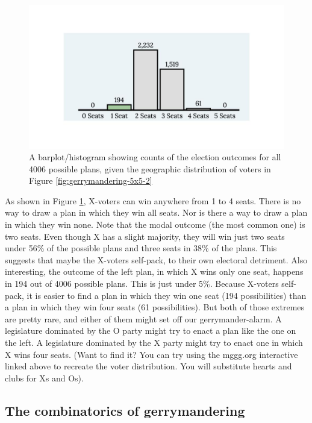\documentclass[
  openany]{book}
\begin{document}
\begin{figure}

{\centering \includegraphics[width=0.9\linewidth]{images/gerrymandering5x5_5}

}

\caption{A barplot/histogram showing counts of the election outcomes for all 4006 possible plans, given the geographic distribution of voters in Figure \ref{fig:gerrymandering-5x5-2}}\label{fig:gerrymandering-5x5-5}
\end{figure}

As shown in Figure \ref{fig:gerrymandering-5x5-5}, X-voters can win anywhere from 1 to 4 seats. There is no way to draw a plan in which they win all seats. Nor is there a way to draw a plan in which they win none. Note that the modal outcome (the most common one) is two seats. Even though X has a slight majority, they will win just two seats under 56\% of the possible plans and three seats in 38\% of the plans. This suggests that maybe the X-voters self-pack, to their own electoral detriment. Also interesting, the outcome of the left plan, in which X wins only one seat, happens in 194 out of 4006 possible plans. This is just under 5\%. Because X-voters self-pack, it is easier to find a plan in which they win one seat (194 possibilities) than a plan in which they win four seats (61 possibilities). But both of those extremes are pretty rare, and either of them might set off our gerrymander-alarm. A legislature dominated by the O party might try to enact a plan like the one on the left. A legislature dominated by the X party might try to enact one in which X wins four seats. (Want to find it? You can try using the mggg.org interactive linked above to recreate the voter distribution. You will substitute hearts and clubs for Xs and Os).

\hypertarget{the-combinatorics-of-gerrymandering}{%
\subsection*{The combinatorics of gerrymandering}\label{the-combinatorics-of-gerrymandering}}
\end{document}
